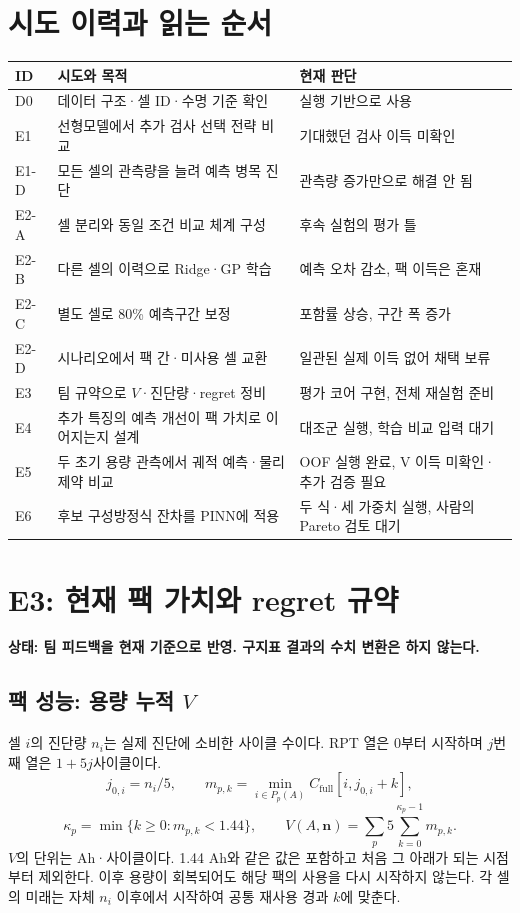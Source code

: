 \documentclass[11pt,a4paper]{article}
\newcommand{\state}[1]{\textbf{상태: #1}}
\begin{document}
\section*{시도 이력과 읽는 순서}
\begin{tabular}{p{.12\linewidth}p{.46\linewidth}p{.32\linewidth}}
\toprule
ID & 시도와 목적 & 현재 판단 \\
\midrule
D0 & 데이터 구조·셀 ID·수명 기준 확인 & 실행 기반으로 사용 \\
E1 & 선형모델에서 추가 검사 선택 전략 비교 & 기대했던 검사 이득 미확인 \\
E1-D & 모든 셀의 관측량을 늘려 예측 병목 진단 & 관측량 증가만으로 해결 안 됨 \\
E2-A & 셀 분리와 동일 조건 비교 체계 구성 & 후속 실험의 평가 틀 \\
E2-B & 다른 셀의 이력으로 Ridge·GP 학습 & 예측 오차 감소, 팩 이득은 혼재 \\
E2-C & 별도 셀로 80\% 예측구간 보정 & 포함률 상승, 구간 폭 증가 \\
E2-D & 시나리오에서 팩 간·미사용 셀 교환 & 일관된 실제 이득 없어 채택 보류 \\
E3 & 팀 규약으로 $V$·진단량·regret 정비 & 평가 코어 구현, 전체 재실험 준비 \\
E4 & 추가 특징의 예측 개선이 팩 가치로 이어지는지 설계 & 대조군 실행, 학습 비교 입력 대기 \\
E5 & 두 초기 용량 관측에서 궤적 예측·물리제약 비교 & OOF 실행 완료, V 이득 미확인·추가 검증 필요 \\
E6 & 후보 구성방정식 잔차를 PINN에 적용 & 두 식·세 가중치 실행, 사람의 Pareto 검토 대기 \\
\bottomrule
\end{tabular}


\clearpage
\section{E3: 현재 팩 가치와 regret 규약}
\state{팀 피드백을 현재 기준으로 반영. 구지표 결과의 수치 변환은 하지 않는다.}

\subsection*{팩 성능: 용량 누적 $V$}
셀 $i$의 진단량 $n_i$는 실제 진단에 소비한 사이클 수이다. RPT 열은 0부터 시작하며 $j$번째 열은 $1+5j$사이클이다.
\[
j_{0,i}=n_i/5,\qquad
m_{p,k}=\min_{i\in P_p(A)}C_{\mathrm{full}}[i,j_{0,i}+k],
\]
\[
\kappa_p=\min\{k\ge0:m_{p,k}<1.44\},\qquad
V(A,\mathbf n)=\sum_p5\sum_{k=0}^{\kappa_p-1}m_{p,k}.
\]
$V$의 단위는 Ah·사이클이다. 1.44 Ah와 같은 값은 포함하고 처음 그 아래가 되는 시점부터 제외한다. 이후 용량이 회복되어도 해당 팩의 사용을 다시 시작하지 않는다. 각 셀의 미래는 자체 $n_i$ 이후에서 시작하여 공통 재사용 경과 $k$에 맞춘다.
\end{document}
